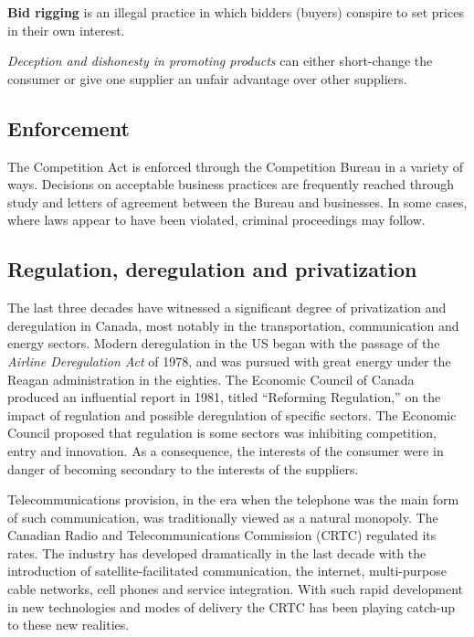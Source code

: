 \begin{DefBox}
	\textbf{Bid rigging} is an illegal practice in which bidders (buyers) conspire to set prices in their own interest.
\end{DefBox}

\textit{Deception and dishonesty in promoting products} can either
short-change the consumer or give one supplier an unfair advantage over
other suppliers.

\subsection*{Enforcement}

The Competition Act is enforced through the Competition Bureau in a variety
of ways. Decisions on acceptable business practices are frequently reached
through study and letters of agreement between the Bureau and businesses. In
some cases, where laws appear to have been violated, criminal proceedings
may follow.

\newhtmlpage

\subsection*{Regulation, deregulation and privatization}

The last three decades have witnessed a significant degree of privatization
and deregulation in Canada, most notably in the transportation,
communication and energy sectors. Modern deregulation in the US began with
the passage of the \textit{Airline Deregulation Act} of 1978, and was
pursued with great energy under the Reagan administration in the eighties.
The Economic Council of Canada produced an influential report in 1981,
titled ``Reforming Regulation,'' on the
impact of regulation and possible deregulation of specific sectors. The
Economic Council proposed that regulation is some sectors was inhibiting
competition, entry and innovation. As a consequence, the interests of the
consumer were in danger of becoming secondary to the interests of the
suppliers.

Telecommunications provision, in the era when the telephone was the main
form of such communication, was traditionally viewed as a natural monopoly.
The Canadian Radio and Telecommunications Commission (CRTC) regulated its
rates. The industry has developed dramatically in the last decade with the
introduction of satellite-facilitated communication, the internet,
multi-purpose cable networks, cell phones and service integration. With such
rapid development in new technologies and modes of delivery the CRTC has
been playing catch-up to these new realities.

